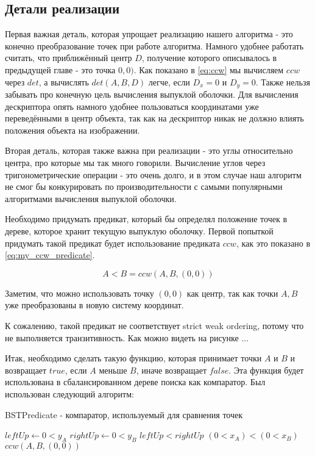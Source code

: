 \subsection{Детали реализации} \label{subsect2_2_2}

Первая важная деталь, которая упрощает реализацию нашего алгоритма - это конечно преобразование точек при работе алгоритма. Намного удобнее работать считать, что приближённый центр $D$, получение которого описывалось в предыдущей главе - это точка $0, 0)$. Как показано в \ref{eq:ccw} мы вычисляем $ccw$ через $det$, а вычислять $det(A, B, D)$ легче, если $D_x = 0$ и $D_y = 0$. Также нельзя забывать про конечную цель вычисления выпуклой оболочки. Для вычисления дескриптора опять намного удобнее пользоваться координатами уже переведёнными в центр объекта, так как на дескриптор никак не должно влиять положения объекта на изображении.

Вторая деталь, которая также важна при реализации - это углы относительно центра, про которые мы так много говорили. Вычисление углов через тригонометрические операции - это очень долго, и в этом случае наш алгоритм не смог бы конкурировать по производительности с самыми популярными алгоритмами вычисления выпуклой оболочки.

Необходимо придумать предикат, который бы определял положение точек в дереве, которое хранит текущую выпуклую оболочку. Первой попыткой придумать такой предикат будет использование предиката $ccw$, как это показано в \ref{eq:my_ccw_predicate}.

\begin{equation}\label{eq:my_ccw_predicate}
A<B=ccw(A, B, (0, 0))
\end{equation}

Заметим, что можно использовать точку $(0, 0)$ как центр, так как точки $A, B$ уже преобразованы в новую систему координат.

К сожалению, такой предикат не соответствует strict weak ordering, потому что не выполняется транзитивность. Как можно видеть на рисунке ... 


Итак, необходимо сделать такую функцию, которая принимает точки $A$ и $B$ и возвращает $true$, если $A$ меньше $B$, иначе возвращает $false$. Эта функция будет использована в сбалансированном дереве поиска как компаратор. Был использован следующий алгоритм:

\begin{algorithm}[H]
	\caption{BSTPredicate - компаратор, используемый для сравнения точек}
	\label{alg:bst_predicate}
	\begin{algorithmic}[1]
		\State $leftUp \gets 0<y_A$
		\State $rightUp \gets 0<y_B$
			\Return $leftUp < rightUp$
		\EndIf
			\Return $(0<x_A) < (0<x_B)$
		\EndIf
		\Return $ccw(A, B, (0, 0))$
		\EndProcedure
	\end{algorithmic}
\end{algorithm}

